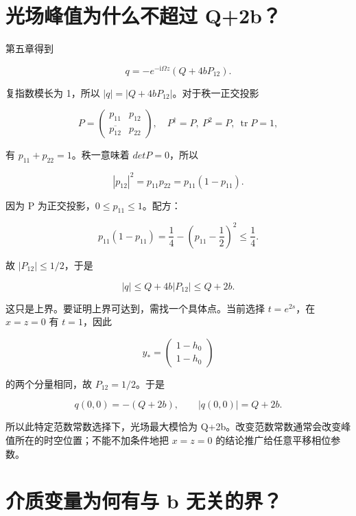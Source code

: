 \section{光场峰值为什么不超过 Q+2b？}
\par

第五章得到\par

\[
q=-e^{-\mathrm{i}\Omega z}(Q+4bP_{12}).
\]

复指数模长为 1，所以 $|q|=|Q+4bP_{12}|$。对于秩一正交投影\par

\[
P=\begin{pmatrix}p_{11}&p_{12}\\\overline{p_{12}}&p_{22}\end{pmatrix},
\quad P^\dagger=P,\ P^2=P,\ \operatorname{tr}P=1,
\]

有 $p_{11}+p_{22}=1$。秩一意味着 $det P=0$，所以\par

\[
|p_{12}|^2=p_{11}p_{22}
=p_{11}(1-p_{11}).
\]

因为 P 为正交投影，$0\le{}p_{11}\le{}1$。配方：\par

\[
p_{11}(1-p_{11})
=\dfrac{1}{4}-\left(p_{11}-\dfrac{1}{2}\right)^2
\le\dfrac{1}{4}.
\]

故 $|P_{12}|\le{}1/2$，于是\par

\[
|q|\le Q+4b|P_{12}|\le Q+2b.
\]

这只是上界。要证明上界可达到，需找一个具体点。当前选择 $t=e^{2s}$，在 $x=z=0$ 有 $t=1$，因此\par

\[
y_*=\begin{pmatrix}1-h_0\\1-h_0\end{pmatrix}
\]

的两个分量相同，故 $P_{12}=1/2$。于是\par

\[
q(0,0)=-(Q+2b),\qquad |q(0,0)|=Q+2b.
\]

所以此特定范数常数选择下，光场最大模恰为 Q+2b。改变范数常数通常会改变峰值所在的时空位置；不能不加条件地把 $x=z=0$ 的结论推广给任意平移相位参数。\par

\section{介质变量为何有与 b 无关的界？}
\par

